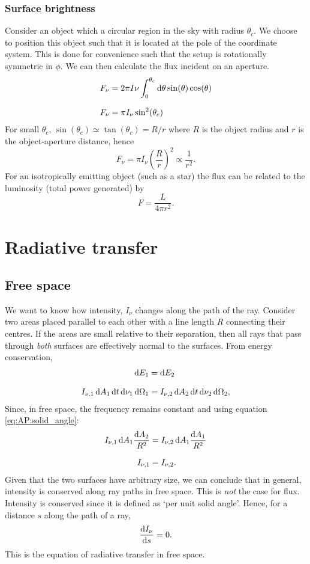 \subsubsection{Surface brightness}
Consider an object which a circular region in the sky with radius $\theta_c$.
 We choose to position this object such that it is located at the pole of the coordinate system.
 This is done for convenience such that the setup is rotationally symmetric in $\phi$.
 We can then calculate the flux incident on an aperture.
%
\begin{align*}
	F_\nu &= 2\pi I\nu \int_{0}^{\theta_c}\diff\theta \sin(\theta) \cos(\theta)
	\linedrop
	F_\nu &= \pi I_\nu \sin^2(\theta_c)
\end{align*}
%
For small $\theta_c$, $\sin(\theta_c) \simeq \tan(\theta_c) = R/r$ where $R$ is the object radius and $r$ is the object-aperture distance, hence
%
$$ F_\nu = \pi I_\nu  \left( \frac{R}{r} \right) ^2 \propto \frac{1}{r^2}. $$
%
For an isotropically emitting object (such as a star) the flux can be related to the luminosity (total power generated) by
%
$$ F = \frac{L}{4\pi r^2}. $$
%
%
%
\section{Radiative transfer}
\subsection{Free space}
We want to know how intensity, $I_\nu$ changes along the path of the ray.
 Consider two areas placed parallel to each other with a line length $R$ connecting their centres.
 If the areas are small relative to their separation, then all rays that pass through \emph{both} surfaces are effectively normal to the surfaces.
 From energy conservation,
\begin{align*}
	\diff E_1 &= \diff E_2
	\linedrop
	I_{\nu ,1}\diff A_1 \diff t \diff \nu_1 \diff \Omega_1 &= I_{\nu ,2}\diff A_2 \diff t \diff \nu_2 \diff \Omega_2 ,	
\end{align*}
%
Since, in free space, the frequency remains constant and using equation \ref{eq:AP:solid_angle}:
%
\begin{align*}
		I_{\nu ,1}\diff A_1 \frac{\diff A_2}{R^2} &= I_{\nu ,2}\diff A_1 \frac{\diff A_1}{R^2}
		\linedrop
		I_{\nu ,1} &= I_{\nu ,2}.
\end{align*}
%
Given that the two surfaces have arbitrary size, we can conclude that in general, intensity is conserved along ray paths in free space.
 This is \emph{not} the case for flux.
 Intensity is conserved since it is defined as `per unit solid angle'.
 Hence, for a distance $s$ along the path of a ray,
%
$$ \frac{\mathop{}\!\mathrm{d} I_\nu}{\mathop{}\!\mathrm{d} s} = 0. $$
%
This is the equation of radiative transfer in free space.
%
%
